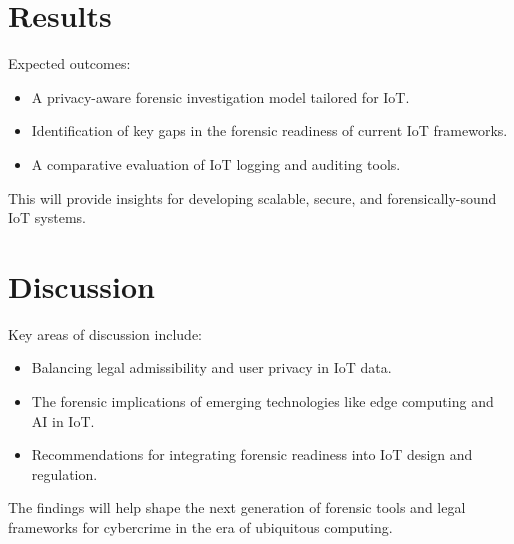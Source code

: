 \documentclass[a4paper,12pt]{article}
\begin{document}
\section{Results}
Expected outcomes:
\begin{itemize}
    \item A privacy-aware forensic investigation model tailored for IoT.
    \item Identification of key gaps in the forensic readiness of current IoT frameworks.
    \item A comparative evaluation of IoT logging and auditing tools.
\end{itemize}
This will provide insights for developing scalable, secure, and forensically-sound IoT systems.

\section{Discussion}
Key areas of discussion include:
\begin{itemize}
    \item Balancing legal admissibility and user privacy in IoT data.
    \item The forensic implications of emerging technologies like edge computing and AI in IoT.
    \item Recommendations for integrating forensic readiness into IoT design and regulation.
\end{itemize}
The findings will help shape the next generation of forensic tools and legal frameworks for cybercrime in the era of ubiquitous computing.



\end{document}
